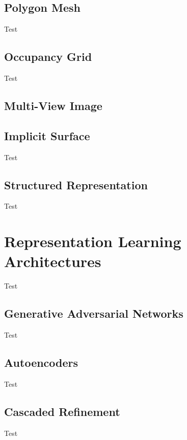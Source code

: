 \subsection{Polygon Mesh}
\label{Polygon Mesh}

Test

\subsection{Occupancy Grid}
\label{Occupancy Grid}

Test

\subsection{Multi-View Image}

\subsection{Implicit Surface}
\label{Implicit Surfaces}

Test

\subsection{Structured Representation}
\label{Structured Representation}

Test


\section{Representation Learning Architectures} \label{Representation Learning}

Test

\subsection{Generative Adversarial Networks}
\label{Generative Adversarial Networks}

Test

\subsection{Autoencoders}
\label{Autoencoders}

Test

\subsection{Cascaded Refinement}
\label{Cascaded Refinement}

Test
